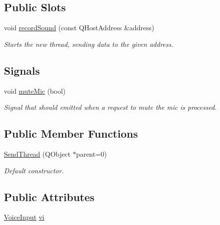\subsection*{\-Public \-Slots}
\begin{DoxyCompactItemize}
\item 
void \hyperlink{class_send_thread_ace7f54d057aea7d6ef58949333095f35}{record\-Sound} (const \-Q\-Host\-Address \&address)
\begin{DoxyCompactList}\small\item\em \-Starts the new thread, sending data to the given address. \end{DoxyCompactList}\end{DoxyCompactItemize}
\subsection*{\-Signals}
\begin{DoxyCompactItemize}
\item 
void \hyperlink{class_send_thread_afff2d01a9c3f193f68840d8bfc3af83d}{mute\-Mic} (bool)
\begin{DoxyCompactList}\small\item\em \-Signal that should emitted when a request to mute the mic is processed. \end{DoxyCompactList}\end{DoxyCompactItemize}
\subsection*{\-Public \-Member \-Functions}
\begin{DoxyCompactItemize}
\item 
\hyperlink{class_send_thread_a69eb38313a68a80b495277f05fa4f7ca}{\-Send\-Thread} (\-Q\-Object $\ast$parent=0)
\begin{DoxyCompactList}\small\item\em \-Default constructor. \end{DoxyCompactList}\end{DoxyCompactItemize}
\subsection*{\-Public \-Attributes}
\begin{DoxyCompactItemize}
\item 
\hyperlink{class_voice_input}{\-Voice\-Input} \hyperlink{class_send_thread_a8b1a2012e2ead9ab029c4e55b49b5d6b}{vi}
\end{DoxyCompactItemize}
